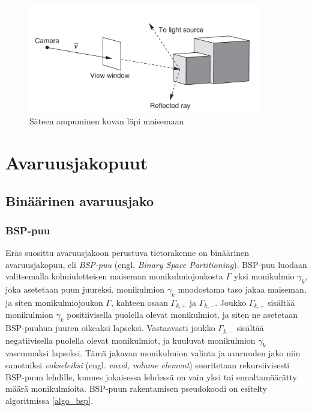 \documentclass[a4paper, 12pt, titlepage]{article}
\begin{document}
\begin{figure}
 \centering 
 \includegraphics[width=0.9\textwidth]{img/raytracing.png}
 \vspace{0.4cm}
 \caption{Säteen ampuminen kuvan läpi maisemaan \citep{janke}}
 \label{raytracing}
 \vspace{-0.5cm}
\end{figure}


\vspace{-0.5cm}

\newpage
\section{Avaruusjakopuut}
\subsection{Binäärinen avaruusjako}
\subsubsection{BSP-puu}

Eräs suosittu avaruusjakoon perustuva tietorakenne on binäärinen avaruusjakopuu, eli \emph{BSP-puu} (engl. \emph{Binary Space Partitioning}). BSP-puu luodaan valitsemalla kolmiulotteisen maiseman  monikulmiojoukosta $\Gamma$ yksi monikulmio $\gamma_k$, joka asetetaan puun juureksi. monikulmion $\gamma_k$ muodostama taso jakaa maiseman, ja siten monikulmiojoukon $\Gamma$, kahteen osaan $\Gamma_{k,+}$ ja $\Gamma_{k,-}$. Joukko $\Gamma_{k,+}$ sisältää monikulmion $\gamma_k$ positiivisella puolella olevat monikulmiot, ja siten ne asetetaan BSP-puuhun juuren oikeaksi lapseksi. Vastaavasti joukko $\Gamma_{k,-}$ sisältää negatiivisella puolella olevat monikulmiot, ja kuuluvat monikulmion $\gamma_k$ vasemmaksi lapseksi. Tämä jakavan monikulmion valinta ja avaruuden jako niin sanotuiksi \emph{vokseleiksi} (engl. \emph{voxel, volume element}) suoritetaan rekursiivisesti BSP-puun lehdille, kunnes jokaisessa lehdessä on vain yksi tai ennaltamäärätty määrä monikulmioita. \citep[.]{samet} BSP-puun rakentamisen pseudokoodi on esitelty algoritmissa \ref{algo_bsp}.\\
\end{document}
